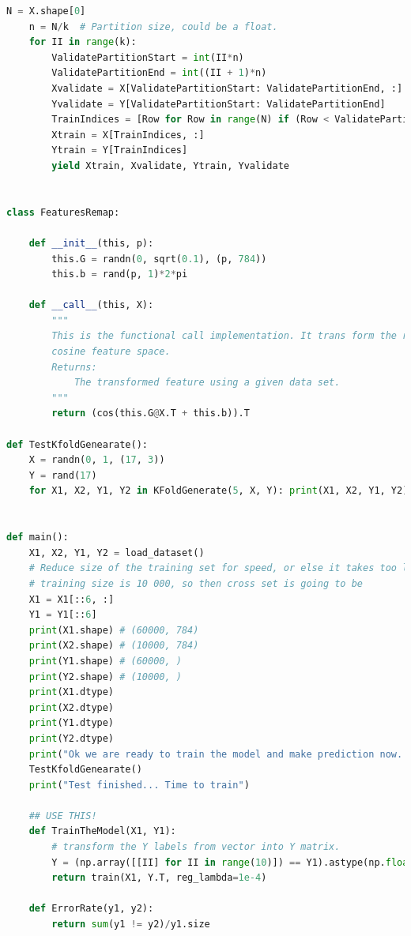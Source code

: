 \documentclass[]{article}
\begin{document}
\begin{lstlisting}[language=python]
	N = X.shape[0]
	n = N/k  # Partition size, could be a float.
	for II in range(k):
		ValidatePartitionStart = int(II*n)
		ValidatePartitionEnd = int((II + 1)*n)
		Xvalidate = X[ValidatePartitionStart: ValidatePartitionEnd, :]
		Yvalidate = Y[ValidatePartitionStart: ValidatePartitionEnd]
		TrainIndices = [Row for Row in range(N) if (Row < ValidatePartitionStart or Row >= ValidatePartitionEnd)]
		Xtrain = X[TrainIndices, :]
		Ytrain = Y[TrainIndices]
		yield Xtrain, Xvalidate, Ytrain, Yvalidate


class FeaturesRemap:

	def __init__(this, p):
		this.G = randn(0, sqrt(0.1), (p, 784))
		this.b = rand(p, 1)*2*pi

	def __call__(this, X):
		"""
		This is the functional call implementation. It trans form the row data matrix to the new
		cosine feature space.
		Returns:
			The transformed feature using a given data set.
		"""
		return (cos(this.G@X.T + this.b)).T

def TestKfoldGenearate():
	X = randn(0, 1, (17, 3))
	Y = rand(17)
	for X1, X2, Y1, Y2 in KFoldGenerate(5, X, Y): print(X1, X2, Y1, Y2)


def main():
	X1, X2, Y1, Y2 = load_dataset()
	# Reduce size of the training set for speed, or else it takes too long to run.
	# training size is 10 000, so then cross set is going to be
	X1 = X1[::6, :]
	Y1 = Y1[::6]
	print(X1.shape) # (60000, 784)
	print(X2.shape) # (10000, 784)
	print(Y1.shape) # (60000, )
	print(Y2.shape) # (10000, )
	print(X1.dtype)
	print(X2.dtype)
	print(Y1.dtype)
	print(Y2.dtype)
	print("Ok we are ready to train the model and make prediction now. ")
	TestKfoldGenearate()
	print("Test finished... Time to train")

	## USE THIS!
	def TrainTheModel(X1, Y1):
		# transform the Y labels from vector into Y matrix.
		Y = (np.array([[II] for II in range(10)]) == Y1).astype(np.float)
		return train(X1, Y.T, reg_lambda=1e-4)

	def ErrorRate(y1, y2):
		return sum(y1 != y2)/y1.size


\end{lstlisting}
\end{document}
